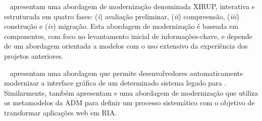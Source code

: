 

~ apresentam uma abordagem de modernização denominada XIRUP, interativa e estruturada em quatro fases: (\textit{i}) avaliação preliminar,
(\textit{ii}) compreensão, (\textit{iii}) construção e (\textit{iv}) migração. Esta abordagem de modernização é baseada em componentes, com foco no levantamento inicial de informações-chave, e depende de um abordagem orientada a modelos com o uso extensivo da experiência dos projetos anteriores. 

~ apresentam uma abordagem que permite desenvolvedores automaticamente modernizar a interface gráfica de um determinado sistema legado para .
%
%
%
 Similarmente,  também apresentam e uma abordagem de modernização que utiliza os metamodelos da ADM para definir um processo sistemático com o objetivo de transformar aplicações web em RIA.
 
 
